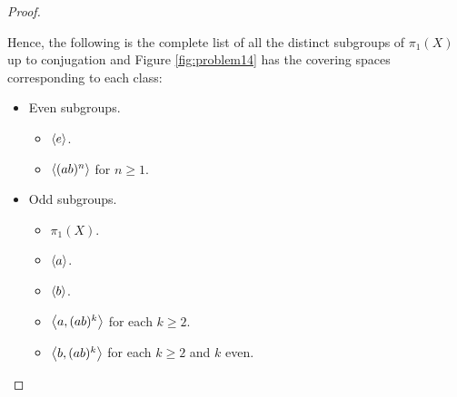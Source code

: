 \documentclass[12pt, psamsfonts]{amsart}
\theoremstyle{definition}
\theoremstyle{remark}
\numberwithin{equation}{section}
\begin{document}
\begin{proof}
\begin{itemize}
\begin{itemize}
      \end{itemize}
    \end{itemize}
  Hence, the following is the complete list of all the distinct subgroups of $\pi_1(X)$ up to conjugation and Figure \ref{fig:problem14} has the covering spaces corresponding to each class:
  \begin{itemize}
    \item
      Even subgroups.
      \begin{itemize}
        \item
          $\ev{e}$.
        \item
          $\ev{(ab)^n}$ for $n \geq 1$.
      \end{itemize}
    \item
      Odd subgroups.
      \begin{itemize}
        \item
          $\pi_1(X)$.
        \item
          $\ev{a}$.
        \item
          $\ev{b}$.
        \item
          $\ev{a, (ab)^k}$ for each $k \geq 2$.
        \item
          $\ev{b, (ab)^k}$ for each $k \geq 2$ and $k$ even.
      \end{itemize}
  \end{itemize}
\end{proof}
\end{document}
